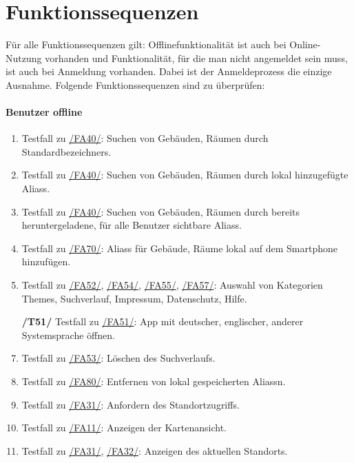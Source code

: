 \section{Funktionssequenzen}

Für alle Funktionssequenzen gilt:
Offlinefunktionalität ist auch bei Online-Nutzung vorhanden und Funktionalität, für die man nicht angemeldet sein muss, ist auch bei Anmeldung vorhanden. Dabei ist der Anmeldeprozess die einzige Ausnahme.
Folgende Funktionssequenzen sind zu überprüfen:

\paragraph{\Gls{Benutzer} offline}
\begin{enumerate}[label=\textbf{/T\arabic*0/}, align=left]
	\item \label{/T10/} Testfall zu \hyperref[/FA40/]{/FA40/}: Suchen von Gebäuden, Räumen durch \Glspl{Standardbezeichner}.
	\item \label{/T20/} Testfall zu \hyperref[/FA40/]{/FA40/}: Suchen von Gebäuden, Räumen durch \gls{lokal} hinzugefügte \Glspl{Alias}.
	\item \label{/T30/} Testfall zu \hyperref[/FA40/]{/FA40/}: Suchen von Gebäuden, Räumen durch bereits heruntergeladene, für alle Benutzer sichtbare \Glspl{Alias}.
	\item \label{/T40/} Testfall zu \hyperref[/FA70/]{/FA70/}: \Glspl{Alias} für Gebäude, Räume \gls{lokal} auf dem Smartphone hinzufügen.
	\item \label{/T50/} Testfall zu \hyperref[/FA52/]{/FA52/}, \hyperref[/FA54/]{/FA54/}, \hyperref[/FA55/]{/FA55/}, \hyperref[/FA57/]{/FA57/}: Auswahl von Kategorien \Glspl{Theme}, Suchverlauf, Impressum, Datenschutz, Hilfe.
	\item[\textbf{/T51/}] \label{/T51/} Testfall zu \hyperref[/FA51/]{/FA51/}: App mit deutscher, englischer, anderer Systemsprache öffnen.
	\item \label{/T60/} Testfall zu \hyperref[/FA53/]{/FA53/}: Löschen des Suchverlaufs.
	\item \label{/T70/} Testfall zu \hyperref[/FA80/]{/FA80/}: Entfernen von \gls{lokal} gespeicherten \Glspl{Alias}n.
	\item \label{/T80/} Testfall zu \hyperref[/FA31/]{/FA31/}: Anfordern des Standortzugriffs.
	\item \label{/T90/} Testfall zu \hyperref[/FA11/]{/FA11/}: Anzeigen der \Gls{Kartenansicht}.
	\item \label{/T100/} Testfall zu \hyperref[/FA31/]{/FA31/}, \hyperref[/FA32/]{/FA32/}: Anzeigen des aktuellen Standorts.

\end{enumerate}

